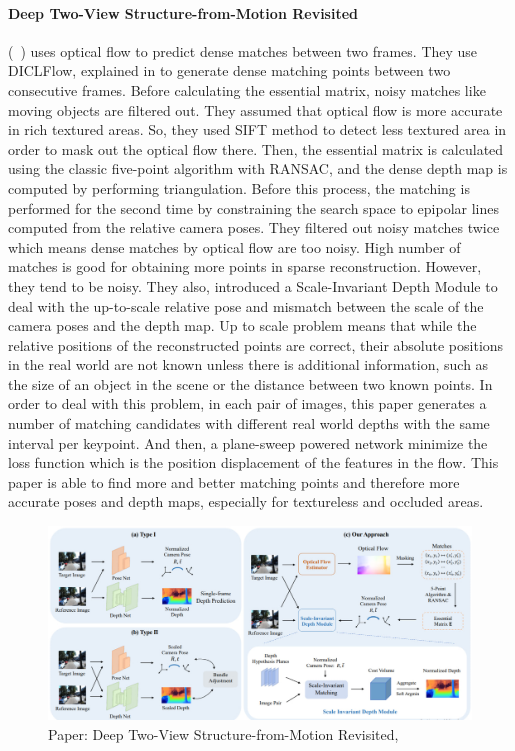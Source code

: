 \documentclass[11pt]{article}
\begin{document}
    \paragraph{Deep Two-View Structure-from-Motion Revisited} (~\cite{wang2021deep}) uses optical flow to predict
    dense matches between two frames. They use DICLFlow, explained in \cite{wang2020displacement} to generate
    dense matching points between two consecutive frames. Before calculating the essential matrix, noisy matches
    like moving objects are filtered out. They assumed that optical flow is more accurate in rich textured areas.
    So, they used SIFT method to detect less textured area in order to mask out the optical flow there.
    Then, the essential matrix is calculated using the classic five-point algorithm with RANSAC, and
    the dense depth map is computed by performing triangulation. Before this process, the matching is performed
    for the second time by constraining the search space to epipolar lines computed from the relative camera poses.
    They filtered out noisy matches twice which means dense matches by optical flow are too noisy. High number of matches is good
    for obtaining more points in sparse reconstruction. However, they tend to be noisy. They also,
    introduced a Scale-Invariant Depth Module to deal with the up-to-scale relative pose and mismatch between the
    scale of the camera poses and the depth map. Up to scale problem means that while the
    relative positions of the reconstructed points are correct, their absolute positions in the real world
    are not known unless there is additional information, such as the size of an object in the scene or the
    distance between two known points. In order to deal with this problem, in each pair of images, this paper
    generates a number of matching candidates with different real world depths with the same interval per keypoint.
    And then, a plane-sweep powered network minimize the loss function which is the position displacement of
    the features in the flow. This paper is able to find more and better matching points and therefore more
    accurate poses and depth maps, especially for textureless and occluded areas.

    \begin{figure}
    \centering
    \includegraphics[width=\textwidth,height=\textheight,keepaspectratio]{images/deep_two_sfm.jpg}
    \caption{Paper: Deep Two-View Structure-from-Motion Revisited, \cite{wang2021deep}}
    \end{figure}
\end{document}
